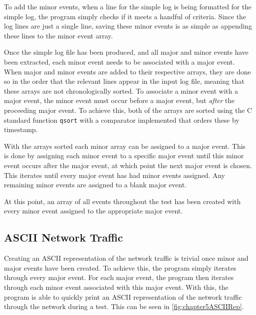 To add the minor events, when a line for the simple log is being formatted for the simple log, the program simply checks if it meets a handful of criteria.
Since the log lines are just a single line, saving these minor events is as simple as appending these lines to the minor event array.


Once the simple log file has been produced, and all major and minor events have been extracted, each minor event needs to be associated with a major event.
When major and minor events are added to their respective arrays, they are done so in the order that the relevant lines appear in the input log file, meaning that these arrays are not chronologically sorted.
To associate a minor event with a major event, the minor event must occur before a major event, but \emph{after} the proceeding major event.
To achieve this, both of the arrays are sorted using the C standard function \texttt{qsort} with a comparator implemented that orders these by timestamp.

With the arrays sorted each minor array can be assigned to a major event.
This is done by assigning each minor event to a specific major event until this minor event occurs after the major event, at which point the next major event is chosen.
This iterates until every major event has had minor events assigned.
Any remaining minor events are assigned to a blank major event.

At this point, an array of all events throughout the test has been created with every minor event assigned to the appropriate major event.


\subsection{ASCII Network Traffic}
Creating an ASCII representation of the network traffic is trivial once minor and major events have been created.
To achieve this, the program simply iterates through every major event.
For each major event, the program then iterates through each minor event associated with this major event.
With this, the program is able to quickly print an ASCII representation of the network traffic through the network during a test.
This can be seen in \figurename{ \ref{fig:chapter5ASCIIRep}}.

